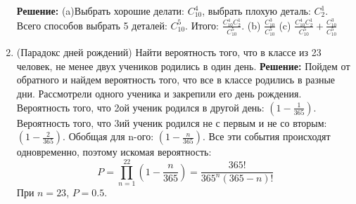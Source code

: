 \documentclass[a4paper, 14pt]{extarticle}
\begin{document}
\begin{enumerate}
\textbf{Решение:}
(a)Выбрать хорошие делати: $C_{10}^4$, выбрать плохую деталь: $C_{2}^1$. Всего способов выбрать 5 деталей: $C_{10}^5$. Итого: $\frac{C_{10}^4C_{2}^1}{C_{10}^5}$. \newline 
(b) $\frac{C_{10}^3}{C_{10}^5}$
\newline
(c) $\frac{C_{10}^4C_{2}^1}{C_{10}^5} + \frac{C_{10}^3}{C_{10}^5}$

\item (Парадокс дней рождений) Найти вероятность того, что в классе из 23 человек, не менее двух учеников родились в один день.
\textbf{Решение:}
Пойдем от обратного и найдем вероятность того, что все в классе родились в разные дни. Рассмотрели одного ученика и закрепили его день рождения. Вероятность того, что 2ой ученик родился в другой день: $(1-\frac{1}{365})$. Вероятность того, что 3ий ученик родился не с первым и не со вторым: $(1-\frac{2}{365})$. Обобщая для n-ого: $(1-\frac{n}{365})$. Все эти события происходят одновременно, поэтому искомая вероятность: 
$$P = \prod_{n=1}^{22} (1-\frac{n}{365}) = \frac{365!}{365^n(365-n)!}$$ 
При $n=23$, $P=0.5$. 
\end{enumerate}
\end{document}
